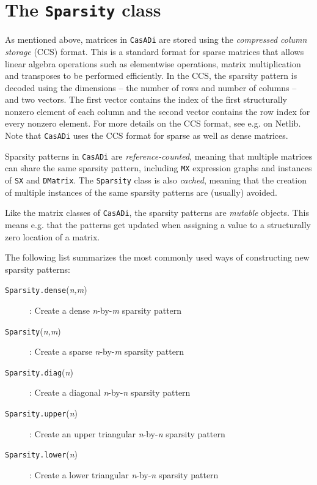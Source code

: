 \documentclass[a4paper,12pt]{book}
\newcommand{\CasADi}{\texttt{CasADi}\xspace}
\begin{document}
\section{The \texttt{Sparsity} class} \label{sec:sparsity_class}
As mentioned above, matrices in \CasADi are stored using the \emph{compressed column storage} (CCS) format. This is a standard format for sparse matrices that allows linear algebra operations such as elementwise operations, matrix multiplication and transposes to be performed efficiently. In the CCS, the sparsity pattern is decoded using the dimensions -- the number of rows and number of columns -- and two vectors. The first vector contains the index of the first structurally nonzero element of each column and the second vector contains the row index for every nonzero element. For more details on the CCS format, see e.g.  on Netlib. Note that \CasADi uses the CCS format for sparse as well as dense matrices.

Sparsity patterns in \CasADi are \emph{reference-counted}, meaning that multiple matrices can share the same sparsity pattern, including \texttt{MX} expression graphs and instances of \texttt{SX} and \texttt{DMatrix}. The \texttt{Sparsity} class is also \emph{cached}, meaning that the creation of multiple instances of the same sparsity patterns are (usually) avoided.

Like the matrix classes of \CasADi, the sparsity patterns are \emph{mutable} objects. This means e.g. that the patterns get updated when assigning a value to a structurally zero location of a matrix.

The following list summarizes the most commonly used ways of constructing new sparsity patterns:
\begin{description}
  \item[\texttt{Sparsity.dense}(\emph{n,m})]: Create a dense \emph{n}-by-\emph{m} sparsity pattern
  \item[\texttt{Sparsity}(\emph{n,m})]: Create a sparse \emph{n}-by-\emph{m} sparsity pattern
  \item[\texttt{Sparsity.diag}(\emph{n})]: Create a diagonal \emph{n}-by-\emph{n} sparsity pattern
  \item[\texttt{Sparsity.upper}(\emph{n})]: Create an upper triangular \emph{n}-by-\emph{n} sparsity pattern
  \item[\texttt{Sparsity.lower}(\emph{n})]: Create a lower triangular \emph{n}-by-\emph{n} sparsity pattern
\end{description}
\end{document}
